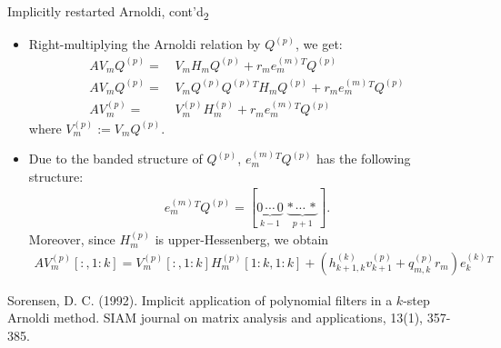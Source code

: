 \documentclass[t,usepdftitle=false]{beamer}
\begin{document}
\begin{frame}{Implicitly restarted Arnoldi, cont'd\textsubscript{2}}
\begin{itemize}
\item Right-multiplying the Arnoldi relation by $Q^{(p)}$, we get:
\begin{align*}
AV_mQ^{(p)}=&\,V_mH_mQ^{(p)}+r_me_m^{(m)}{}^TQ^{(p)}\\
AV_mQ^{(p)}=&\,V_mQ^{(p)}Q^{(p)}{}^TH_mQ^{(p)}+r_me_m^{(m)}{}^TQ^{(p)}\\
AV_m^{(p)}=&\,V_m^{(p)}H_m^{(p)}+r_me_m^{(m)}{}^TQ^{(p)}
\end{align*}
where $V_m^{(p)}:=V_mQ^{(p)}$.
\item[] Due to the banded structure of $Q^{(p)}$, $e_m^{(m)}{}^TQ^{(p)}$ has the following structure:
\begin{align*}
e_m^{(m)}{}^TQ^{(p)}
=
[\underbrace{0\,\cdots\,0}_{k-1}\;\underbrace{*\,\cdots\,*}_{p+1}].
\end{align*}
Moreover, since $H^{(p)}_m$ is upper-Hessenberg, we obtain
\begin{align*}
AV_m^{(p)}[:,1\!:\!k]=
V_m^{(p)}[:,1\!:\!k]H_m^{(p)}[1\!:\!k,1\!:\!k]
+
\left(
h^{(k)}_{k+1,k}v_{k+1}^{(p)}+q^{(p)}_{m,k}r_m
\right)
e_k^{(k)}{}^T
\end{align*}
\end{itemize}\smallskip
\tiny{Sorensen, D. C. (1992). Implicit application of polynomial filters in a $k$-step Arnoldi method. SIAM journal on matrix analysis and applications, 13(1), 357-385.}
\end{frame}
\end{document}
